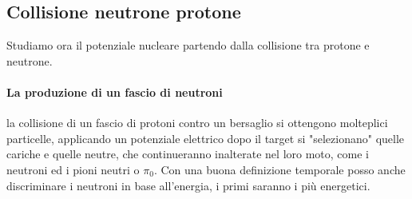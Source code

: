 \subsection{Collisione neutrone protone}
Studiamo ora il potenziale nucleare partendo dalla collisione tra protone e neutrone.
\paragraph{La produzione di un fascio di neutroni} la collisione di un fascio di protoni contro un bersaglio si ottengono molteplici particelle, applicando un potenziale elettrico dopo il target si "selezionano" quelle cariche e quelle neutre, che continueranno inalterate nel loro moto, come i neutroni ed i pioni neutri o $\pi_0$.
Con una buona definizione temporale posso anche discriminare i neutroni in base all'energia, i primi saranno i più energetici.

